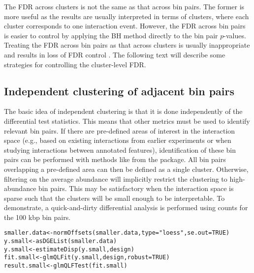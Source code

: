 \documentclass{report}\usepackage[]{graphicx}\usepackage[usenames,dvipsnames]{color}
\newcommand{\hlnum}[1]{\textcolor[rgb]{0.816,0.125,0.439}{#1}}%
\newcommand{\hlstr}[1]{\textcolor[rgb]{0.251,0.627,0.251}{#1}}%
\newcommand{\hlstd}[1]{\textcolor[rgb]{0.251,0.251,0.251}{#1}}%
\newcommand{\hlkwb}[1]{\textcolor[rgb]{0,0,0}{#1}}%
\newcommand{\hlkwc}[1]{\textcolor[rgb]{0.251,0.251,0.251}{#1}}%
\newcommand{\hlkwd}[1]{\textcolor[rgb]{0.878,0.439,0.125}{#1}}%
\newenvironment{knitrout}{}{} %
\begin{document}
The FDR across clusters is not the same as that across bin pairs.
The former is more useful as the results are usually interpreted in terms of clusters, where each cluster corresponds to one interaction event.
However, the FDR across bin pairs is easier to control by applying the BH method directly to the bin pair $p$-values.
Treating the FDR across bin pairs as that across clusters is usually inappropriate and results in loss of FDR control \cite{lun2014denovo}.
The following text will describe some strategies for controlling the cluster-level FDR.

\subsection{Independent clustering of adjacent bin pairs}
\label{sec:independentcluster}

The basic idea of independent clustering is that it is done independently of the differential test statistics.
This means that other metrics must be used to identify relevant bin pairs.
If there are pre-defined areas of interest in the interaction space
    (e.g., based on existing interactions from earlier experiments or when studying interactions between annotated features),
    identification of these bin pairs can be performed with methods like  from the  package.
All bin pairs overlapping a pre-defined area can then be defined as a single cluster.
Otherwise, filtering on the average abundance will implicitly restrict the clustering to high-abundance bin pairs.
This may be satisfactory when the interaction space is sparse such that the clusters will be small enough to be interpretable.
To demonstrate, a quick-and-dirty differential analysis is performed using counts for the 100 kbp bin pairs.

\begin{knitrout}
\color{fgcolor}\begin{kframe}
\begin{alltt}
\hlstd{smaller.data} \hlkwb{<-} \hlkwd{normOffsets}\hlstd{(smaller.data,} \hlkwc{type}\hlstd{=}\hlstr{"loess"}\hlstd{,} \hlkwc{se.out}\hlstd{=}\hlnum{TRUE}\hlstd{)}
\hlstd{y.small} \hlkwb{<-} \hlkwd{asDGEList}\hlstd{(smaller.data)}
\hlstd{y.small} \hlkwb{<-} \hlkwd{estimateDisp}\hlstd{(y.small, design)}
\hlstd{fit.small} \hlkwb{<-} \hlkwd{glmQLFit}\hlstd{(y.small, design,} \hlkwc{robust}\hlstd{=}\hlnum{TRUE}\hlstd{)}
\hlstd{result.small} \hlkwb{<-} \hlkwd{glmQLFTest}\hlstd{(fit.small)}
\end{alltt}
\end{kframe}
\end{knitrout}
\end{document}
